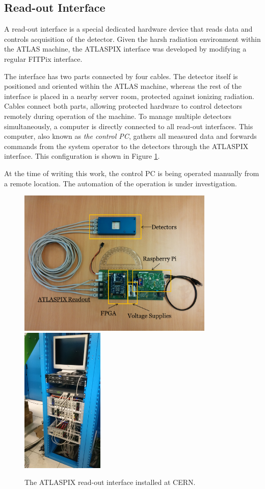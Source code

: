 \subsection{Read-out Interface}
A read-out interface is a special dedicated hardware device that reads data and controls acquisition of the detector. \cite{TurecekThesis2011} Given the harsh radiation environment within the ATLAS machine, the ATLASPIX interface was developed by modifying a regular FITPix interface.


The interface has two parts connected by four cables. The detector itself is positioned and oriented within the ATLAS machine, whereas the rest of the interface is placed in a nearby server room, protected against ionizing radiation. Cables connect both parts, allowing protected hardware to control detectors remotely during operation of the machine. To manage multiple detectors simultaneously, a computer is directly connected to all read-out interfaces. This computer, also known as \textit{the control PC}, gathers all measured data and forwards commands from the system operator to the detectors through the ATLASPIX interface. This configuration is shown in Figure \ref{fig:ATLASPIX}.

At the time of writing this work, the control PC is being operated manually from a remote location. The automation of the operation is under investigation.

\begin{figure}[t]
\begin{center}
\includegraphics[height=7cm]{figures/imported/atlaspix}
\includegraphics[height=7cm]{figures/imported/atlaspix-installed}
\caption{The ATLASPIX read-out interface installed at CERN.}
\label{fig:ATLASPIX}
\end{center}
\end{figure}

